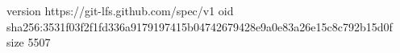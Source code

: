 version https://git-lfs.github.com/spec/v1
oid sha256:3531f03f2f1fd336a9179197415b04742679428e9a0e83a26e15c8c792b15d0f
size 5507
